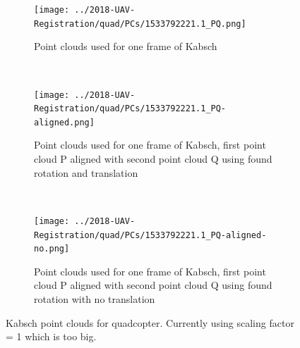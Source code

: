 \documentclass[12pt,a4paper]{article}
\begin{document}
\begin{figure}[p]
  \centering
  \begin{subfigure}[t]{\textwidth}
  \centering
  \texttt{[image: ../2018-UAV-Registration/quad/PCs/1533792221.1\_PQ.png]}
  \caption{Point clouds used for one frame of Kabsch}
  \end{subfigure}
  \\
  \begin{subfigure}[t]{0.5\textwidth}
  \centering
  \texttt{[image: ../2018-UAV-Registration/quad/PCs/1533792221.1\_PQ-aligned.png]}
  \caption{Point clouds used for one frame of Kabsch, first point cloud P aligned with second point cloud Q using found rotation and translation}
  \end{subfigure}%
  ~
    \begin{subfigure}[t]{0.5\textwidth}
  \centering
  \texttt{[image: ../2018-UAV-Registration/quad/PCs/1533792221.1\_PQ-aligned-no.png]}
  \caption{Point clouds used for one frame of Kabsch, first point cloud P aligned with second point cloud Q using found rotation with no translation}
  \end{subfigure}
  \caption{Kabsch point clouds for quadcopter. Currently using scaling factor = 1 which is too big.}
  \label{f: Kabsch quad bad}
\end{figure}





\end{document}
